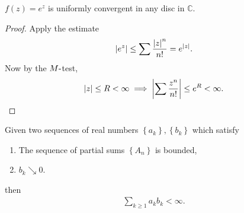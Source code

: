 \begin{proposition}

\(f(z) = e^z\) is uniformly convergent in any disc in \({\mathbb{C}}\).

\end{proposition}

\begin{proof}

Apply the estimate
\begin{align*}  
{\left\lvert {e^z} \right\rvert} \leq \sum {{\left\lvert {z} \right\rvert}^n \over n!} = e^{{\left\lvert {z} \right\rvert}}
.\end{align*}
Now by the \(M{\hbox{-}}\)test,
\begin{align*}  
{\left\lvert {z} \right\rvert} \leq R < \infty \implies {\left\lvert {\sum {z^n \over n!}} \right\rvert} \leq e^R < \infty
.\end{align*}

\end{proof}

\begin{lemma}

Given two sequences of real numbers
\(\left\{{ a_k }\right\} , \left\{{ b_k }\right\}\) which satisfy

\begin{enumerate}
\def\labelenumi{\arabic{enumi}.}
\tightlist
\item
  The sequence of partial sums \(\left\{{ A_n }\right\}\) is bounded,
\item
  \(b_k \searrow 0\).
\end{enumerate}

then
\begin{align*}
\sum_{k\geq 1} a_k b_k < \infty
.\end{align*}

\end{lemma}

